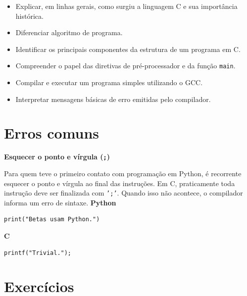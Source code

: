 \documentclass[12pt,a4paper,oneside]{extreport}
\begin{document}
\begin{tcolorbox}[title={Ao final deste capítulo, você deve ser capaz de:}]

\begin{itemize}
    \item Explicar, em linhas gerais, como surgiu a linguagem C e sua importância histórica.
    \item Diferenciar algoritmo de programa.
    \item Identificar os principais componentes da estrutura de um programa em C.
    \item Compreender o papel das diretivas de pré-processador e da função \texttt{main}.
    \item Compilar e executar um programa simples utilizando o GCC.
    \item Interpretar mensagens básicas de erro emitidas pelo compilador.
\end{itemize}

\end{tcolorbox}

\section*{Erros comuns}

\begin{errocomum}

\textbf{Esquecer o ponto e vírgula (\texttt{;})}

Para quem teve o primeiro contato com programação em Python, é recorrente esquecer o ponto e vírgula ao final das instruções. Em C, praticamente toda instrução deve ser finalizada com \texttt{';'}. Quando isso não acontece, o compilador informa um erro de sintaxe.
\newline
\newline \textbf{Python}

\begin{lstlisting}
print("Betas usam Python.")
\end{lstlisting}

\textbf{C}

\begin{lstlisting}
printf("Trivial.");
\end{lstlisting}

\end{errocomum}


\section*{Exercícios}
\end{document}
